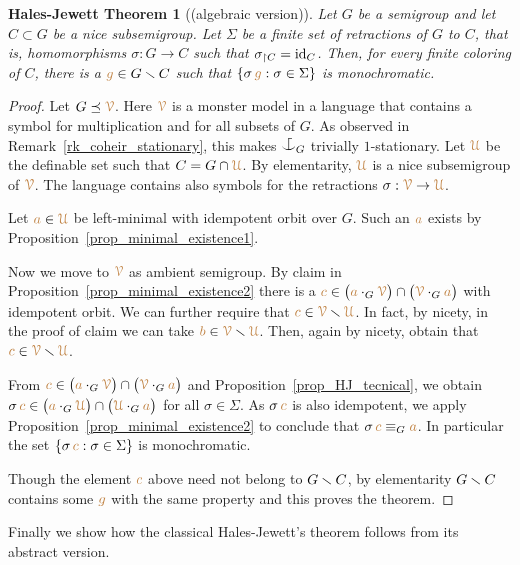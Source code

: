 \documentclass[creche.tex]{subfiles}
\begin{document}
\theoremstyle{mio}
\newtheorem{HalesJewett}[thm]{Hales-Jewett Theorem}
\begin{HalesJewett}[(algebraic version)]\label{thm_abstract_HJ}
Let $G$ be a semigroup and let $C\subset G$ be a nice subsemigroup.
Let $\Sigma$ be a finite set of retractions of $G$ to $C$, that is, 
homomorphisms $\sigma:G\to C$ such that $\sigma_{\restriction C}={\rm id}_C$.
Then, for every finite coloring of $C$,
there is a ${\color{brown} g}\in G\smallsetminus C$ such that $\{\sigma\,{\color{brown} g}:\sigma\in\Sigma\}$ is monochromatic.
\end{HalesJewett}

\begin{proof}
Let $G\preceq{\color{brown}\EuScript V}$.
Here ${\color{brown}\EuScript V}$ is a monster model in a language that contains 
a symbol for multiplication and for all subsets of $G$.
As observed in Remark~\ref{rk_coheir_stationary}, 
this makes $\nonforkc_G$ trivially $1$-stationary.
Let ${\color{brown}\EuScript U}$ be the definable set such that $C=G\cap{\color{brown}\EuScript U}$.
By elementarity, ${\color{brown}\EuScript U}$ is a nice subsemigroup of ${\color{brown}\EuScript V}$.
The language contains also symbols for 
the retractions $\sigma:{\color{brown}\EuScript V}\to{\color{brown}\EuScript U}$.

Let ${\color{brown} a}\in{\color{brown}\EuScript U}$ be left-minimal with idempotent orbit over $G$.
Such an ${\color{brown} a}$ exists by Proposition~\ref{prop_minimal_existence1}.

Now we move to ${\color{brown}\EuScript V}$ as ambient semigroup.
By claim  in Proposition~\ref{prop_minimal_existence2}
there is a ${\color{brown} c}\in\big({\color{brown} a}\cdot_G{\color{brown}\EuScript V}\big)\cap\big({\color{brown}\EuScript V}\cdot_G{\color{brown} a}\big)$ 
with idempotent orbit.
We can further require that ${\color{brown} c}\in{\color{brown}\EuScript V}\smallsetminus{\color{brown}\EuScript U}$. 
In fact, by nicety, in the proof of claim  we can take ${\color{brown} b}\in{\color{brown}\EuScript V}\smallsetminus{\color{brown}\EuScript U}$.
Then, again by nicety, obtain that ${\color{brown} c}\in{\color{brown}\EuScript V}\smallsetminus{\color{brown}\EuScript U}$.

From ${\color{brown} c}\in\big({\color{brown} a}\cdot_G{\color{brown}\EuScript V}\big)\cap\big({\color{brown}\EuScript V}\cdot_G{\color{brown} a}\big)$
and Proposition~\ref{prop_HJ_tecnical}, we obtain 
$\sigma\,{\color{brown} c}\in\big({\color{brown} a}\cdot_G{\color{brown}\EuScript U}\big)\cap\big({\color{brown}\EuScript U}\cdot_G{\color{brown} a}\big)$
for all $\sigma\in\Sigma$.
As $\sigma\,{\color{brown} c}$ is also idempotent, 
we apply Proposition~\ref{prop_minimal_existence2} to conclude that 
$\sigma\,{\color{brown} c}\equiv_G{\color{brown} a}$.
In particular the set $\{\sigma\,{\color{brown} c}:\sigma\in\Sigma\}$ is monochromatic. 

Though the element ${\color{brown} c}$ above need not belong to $G\smallsetminus C$,
by elementarity $G\smallsetminus C$ contains some ${\color{brown} g}$ with the same property and this proves the theorem.
\end{proof}

Finally we show how the classical Hales-Jewett's theorem follows from its abstract version.
\end{document}
